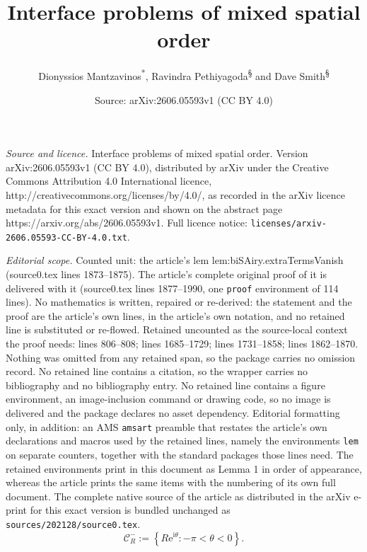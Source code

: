 \documentclass[10pt,a4paper]{amsart}
\title{Interface problems of mixed spatial order}
\author{Dionyssios Mantzavinos\textsuperscript{*}, Ravindra Pethiyagoda\textsuperscript{\S} and Dave Smith\textsuperscript{\S\textdagger}}
\date{Source: arXiv:2606.05593v1 (CC BY 4.0)}
\newcommand{\re}{\ensuremath{\mathrm{e}}}
\newcommand{\ri}{\ensuremath{\mathrm{i}}}
\begin{document}
\maketitle

\noindent\emph{Source and licence.} Interface problems of mixed spatial order. Version arXiv:2606.05593v1 (CC BY 4.0), distributed by arXiv under the Creative Commons Attribution 4.0 International licence, http://creativecommons.org/licenses/by/4.0/, as recorded in the arXiv licence metadata for this exact version and shown on the abstract page https://arxiv.org/abs/2606.05593v1. Full licence notice: \texttt{licenses/arxiv-2606.05593-CC-BY-4.0.txt}.\par\smallskip

\noindent\textit{Editorial scope.} Counted unit: the article's lem lem:biSAiry.extraTermsVanish (source0.tex lines 1873--1875). The article's complete original proof of it is delivered with it (source0.tex lines 1877--1990, one \texttt{proof} environment of 114 lines). No mathematics is written, repaired or re-derived: the statement and the proof are the article's own lines, in the article's own notation, and no retained line is substituted or re-flowed.  Retained uncounted as the source-local context the proof needs: lines 806--808; lines 1685--1729; lines 1731--1858; lines 1862--1870.  Nothing was omitted from any retained span, so the package carries no omission record.  No retained line contains a citation, so the wrapper carries no bibliography and no bibliography entry.  No retained line contains a figure environment, an image-inclusion command or drawing code, so no image is delivered and the package declares no asset dependency.  Editorial formatting only, in addition: an AMS \texttt{amsart} preamble that restates the article's own declarations and macros used by the retained lines, namely the environments \texttt{lem} on separate counters, together with the standard packages those lines need.  The retained environments print in this document as Lemma 1 in order of appearance, whereas the article prints the same items with the numbering of its own full document.  The complete native source of the article as distributed in the arXiv e-print for this exact version is bundled unchanged as \texttt{sources/202128/source0.tex}.
\begin{equation} \label{eqn:lSAiry.defnCRminus}
  \mathcal C_R^- := \left\{R\re^{\ri\theta}: -\pi < \theta < 0\right\}.
\end{equation}
\end{document}
